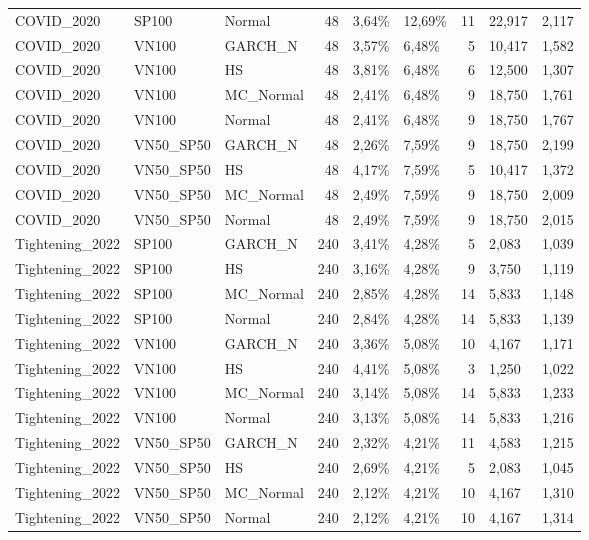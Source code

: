 \begin{longtable}{lllrllrll}
COVID\_2020 & SP100 & Normal & 48 & 3,64\% & 12,69\% & 11 & 22,917 & 2,117 \\
COVID\_2020 & VN100 & GARCH\_N & 48 & 3,57\% & 6,48\% & 5 & 10,417 & 1,582 \\
COVID\_2020 & VN100 & HS & 48 & 3,81\% & 6,48\% & 6 & 12,500 & 1,307 \\
COVID\_2020 & VN100 & MC\_Normal & 48 & 2,41\% & 6,48\% & 9 & 18,750 & 1,761 \\
COVID\_2020 & VN100 & Normal & 48 & 2,41\% & 6,48\% & 9 & 18,750 & 1,767 \\
COVID\_2020 & VN50\_SP50 & GARCH\_N & 48 & 2,26\% & 7,59\% & 9 & 18,750 & 2,199 \\
COVID\_2020 & VN50\_SP50 & HS & 48 & 4,17\% & 7,59\% & 5 & 10,417 & 1,372 \\
COVID\_2020 & VN50\_SP50 & MC\_Normal & 48 & 2,49\% & 7,59\% & 9 & 18,750 & 2,009 \\
COVID\_2020 & VN50\_SP50 & Normal & 48 & 2,49\% & 7,59\% & 9 & 18,750 & 2,015 \\
Tightening\_2022 & SP100 & GARCH\_N & 240 & 3,41\% & 4,28\% & 5 & 2,083 & 1,039 \\
Tightening\_2022 & SP100 & HS & 240 & 3,16\% & 4,28\% & 9 & 3,750 & 1,119 \\
Tightening\_2022 & SP100 & MC\_Normal & 240 & 2,85\% & 4,28\% & 14 & 5,833 & 1,148 \\
Tightening\_2022 & SP100 & Normal & 240 & 2,84\% & 4,28\% & 14 & 5,833 & 1,139 \\
Tightening\_2022 & VN100 & GARCH\_N & 240 & 3,36\% & 5,08\% & 10 & 4,167 & 1,171 \\
Tightening\_2022 & VN100 & HS & 240 & 4,41\% & 5,08\% & 3 & 1,250 & 1,022 \\
Tightening\_2022 & VN100 & MC\_Normal & 240 & 3,14\% & 5,08\% & 14 & 5,833 & 1,233 \\
Tightening\_2022 & VN100 & Normal & 240 & 3,13\% & 5,08\% & 14 & 5,833 & 1,216 \\
Tightening\_2022 & VN50\_SP50 & GARCH\_N & 240 & 2,32\% & 4,21\% & 11 & 4,583 & 1,215 \\
Tightening\_2022 & VN50\_SP50 & HS & 240 & 2,69\% & 4,21\% & 5 & 2,083 & 1,045 \\
Tightening\_2022 & VN50\_SP50 & MC\_Normal & 240 & 2,12\% & 4,21\% & 10 & 4,167 & 1,310 \\
Tightening\_2022 & VN50\_SP50 & Normal & 240 & 2,12\% & 4,21\% & 10 & 4,167 & 1,314 \\
\end{longtable}

